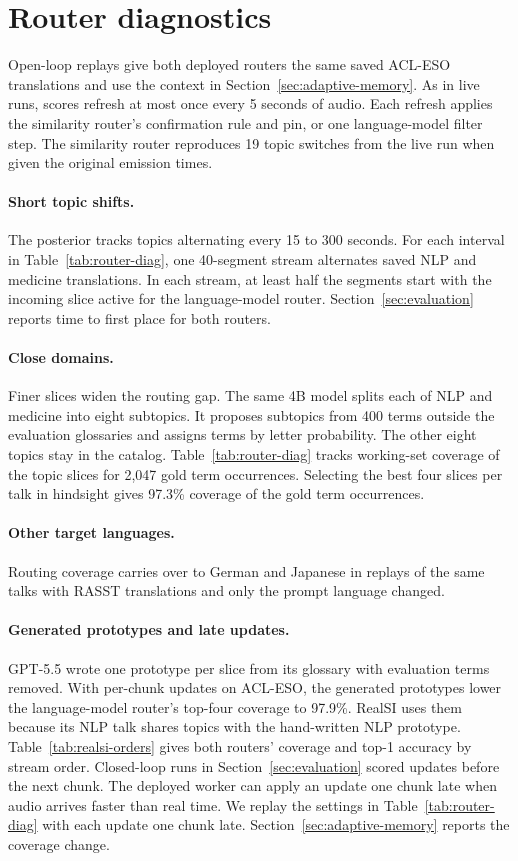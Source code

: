 \section{Router diagnostics}
\label{app:router}

Open-loop replays give both deployed routers the same saved ACL-ESO
translations and use the context in Section~\ref{sec:adaptive-memory}.
As in live runs, scores refresh at most once every 5 seconds of audio.
Each refresh applies the similarity router's confirmation rule and pin,
or one language-model filter step. The similarity router reproduces 19 topic
switches from the live run when given the original emission times.

\paragraph{Short topic shifts.}
The posterior tracks topics alternating every 15 to 300 seconds. For each
interval in Table~\ref{tab:router-diag}, one 40-segment stream alternates saved NLP
and medicine translations. In each stream, at least half the segments start
with the incoming slice active for the language-model router.
Section~\ref{sec:evaluation} reports time to first place for both routers.

\paragraph{Close domains.}
Finer slices widen the routing gap. The same 4B model splits each of NLP
and medicine into eight subtopics. It proposes subtopics from 400 terms
outside the evaluation glossaries and assigns terms by letter probability.
The other eight topics stay in the catalog. Table~\ref{tab:router-diag}
tracks working-set coverage of the topic slices for 2,047 gold term
occurrences. Selecting the best four slices per talk in hindsight gives
97.3\% coverage of the gold term occurrences.

\paragraph{Other target languages.}
Routing coverage carries over to German and Japanese in replays of the same
talks with RASST translations and only the prompt language changed.

\paragraph{Generated prototypes and late updates.}
GPT-5.5 wrote one prototype per slice from its glossary with evaluation
terms removed. With per-chunk updates on ACL-ESO, the generated prototypes
lower the language-model router's top-four coverage to 97.9\%. RealSI uses
them because its NLP talk shares topics with the hand-written NLP prototype.
Table~\ref{tab:realsi-orders} gives both routers' coverage and top-1 accuracy
by stream order. Closed-loop runs in Section~\ref{sec:evaluation} scored
updates before the next chunk. The deployed worker can apply an update one
chunk late when audio arrives faster than real time. We replay the settings in
Table~\ref{tab:router-diag} with each update one chunk late.
Section~\ref{sec:adaptive-memory} reports the coverage change.

